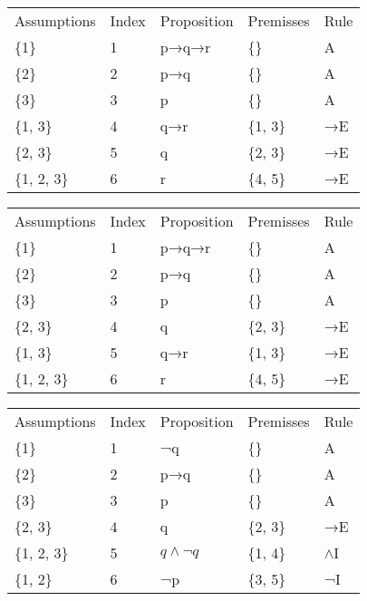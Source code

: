 \documentclass[a4paper,12pt]{book}
\begin{document}
\begin{tabular}{lllll}
\toprule
Assumptions & Index & Proposition & Premisses & Rule \\
        \{1\} &     1 &       p→q→r &        \{\} &    A \\
\midrule
        \{2\} &     2 &         p→q &        \{\} &    A \\
        \{3\} &     3 &           p &        \{\} &    A \\
     \{1, 3\} &     4 &         q→r &    \{1, 3\} &   →E \\
     \{2, 3\} &     5 &           q &    \{2, 3\} &   →E \\
  \{1, 2, 3\} &     6 &           r &    \{4, 5\} &   →E \\
\bottomrule
\end{tabular}
\begin{tabular}{lllll}
\toprule
Assumptions & Index & Proposition & Premisses & Rule \\
        \{1\} &     1 &       p→q→r &        \{\} &    A \\
\midrule
        \{2\} &     2 &         p→q &        \{\} &    A \\
        \{3\} &     3 &           p &        \{\} &    A \\
     \{2, 3\} &     4 &           q &    \{2, 3\} &   →E \\
     \{1, 3\} &     5 &         q→r &    \{1, 3\} &   →E \\
  \{1, 2, 3\} &     6 &           r &    \{4, 5\} &   →E \\
\bottomrule
\end{tabular}
\begin{tabular}{lllll}
\toprule
Assumptions & Index & Proposition & Premisses & Rule \\
        \{1\} &     1 &          ¬q &        \{\} &    A \\
\midrule
        \{2\} &     2 &         p→q &        \{\} &    A \\
        \{3\} &     3 &           p &        \{\} &    A \\
     \{2, 3\} &     4 &           q &    \{2, 3\} &   →E \\
  \{1, 2, 3\} &     5 &       $q\wedge ¬q$ &    \{1, 4\} &   $\wedge$I \\
     \{1, 2\} &     6 &          ¬p &    \{3, 5\} &   ¬I \\
\bottomrule
\end{tabular}
\end{document}
